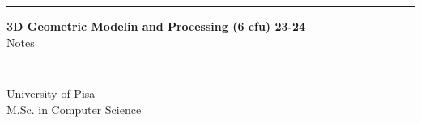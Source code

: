 \documentclass[12pt]{report}
\begin{document}
\begin{titlepage}
\hrule
\vspace{15pt}
\begin{center}
    \Huge{\textbf{\Huge \textbf{3D Geometric Modelin and Processing (6 cfu) 23-24}} \\ Notes}\\
\end{center}
\vspace{15pt}
\hrule
\vfill
\hrule
\begin{center}
    \Large University of Pisa \\ M.Sc. in Computer Science
\end{center}
\end{titlepage}

\tableofcontents






\nocite{*}

\clearpage
\end{document}

